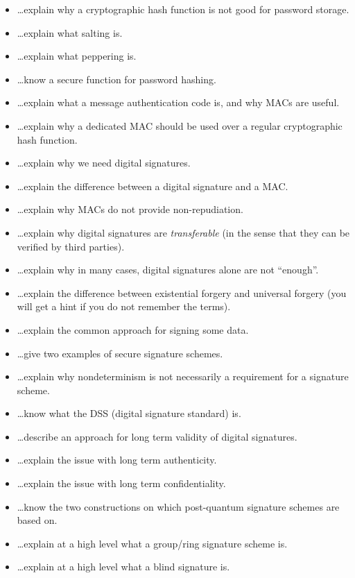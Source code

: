 \documentclass[usegeometry,parskip=half]{scrartcl}
\begin{document}
\begin{itemize}
  \item \dots{}explain why a cryptographic hash function is not good for password storage.
  \item \dots{}explain what salting is.
  \item \dots{}explain what peppering is.
  \item \dots{}know a secure function for password hashing.
  \item \dots{}explain what a message authentication code is, and why MACs are useful.
  \item \dots{}explain why a dedicated MAC should be used over a regular cryptographic hash function.
  \item \dots{}explain why we need digital signatures.
  \item \dots{}explain the difference between a digital signature and a MAC.
  \item \dots{}explain why MACs do not provide non-repudiation.
  \item \dots{}explain why digital signatures are \emph{transferable} (in the sense that they can be verified by third parties).
  \item \dots{}explain why in many cases, digital signatures alone are not \enquote{enough}.
  \item \dots{}explain the difference between existential forgery and universal forgery (you will get a hint if you do not remember the terms).
  \item \dots{}explain the common approach for signing some data.
  \item \dots{}give two examples of secure signature schemes.
  \item \dots{}explain why nondeterminism is not necessarily a requirement for a signature scheme.
  \item \dots{}know what the DSS (digital signature standard) is.
  \item \dots{}describe an approach for long term validity of digital signatures.
  \item \dots{}explain the issue with long term authenticity.
  \item \dots{}explain the issue with long term confidentiality.
  \item \dots{}know the two constructions on which post-quantum signature schemes are based on.
  \item \dots{}explain at a high level what a group/ring signature scheme is.
  \item \dots{}explain at a high level what a blind signature is.

\end{itemize}
\end{document}
